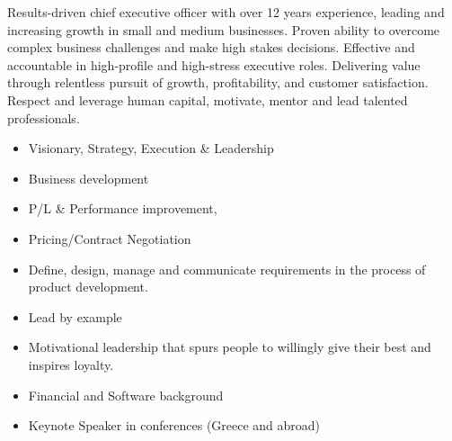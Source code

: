 \documentclass[10pt,a4paper]{article} %
\begin{document}
\begin{multicols}{2}  %
  \noindent
  Results-driven chief executive officer with over 12 years experience, leading and increasing growth
  in small and medium businesses. Proven ability to overcome complex business challenges and make high
  stakes decisions. Effective and accountable in high-profile and high-stress executive roles. Delivering
  value through relentless pursuit of growth, profitability, and customer satisfaction.
  Respect and leverage human capital, motivate, mentor and lead talented professionals.

  \begin{itemize}
  \item    Visionary, Strategy, Execution & Leadership
\item Business development
\item P/L & Performance improvement,
\item Pricing/Contract Negotiation
\item Define, design, manage and communicate requirements in the process of product development.
\item Lead by example
\item Motivational leadership that spurs people to willingly give their best and inspires loyalty.
\item Financial and Software background
\item Keynote Speaker in conferences (Greece and abroad)
    \end{itemize}


\end{multicols}

\spacedhrule{0.5em}{-0.4em} %


\end{document}
